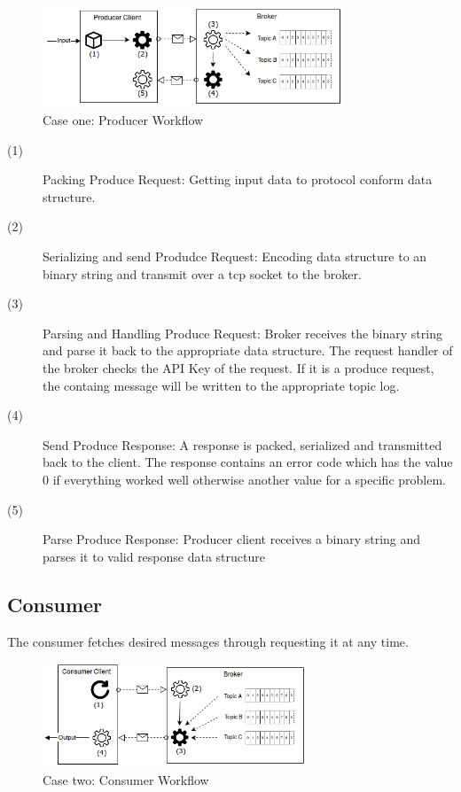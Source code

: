 \begin{figure}[H]
    \centering
    \includegraphics[width=0.8\textwidth]{images/concept_producer.png}
    \caption{Case one: Producer Workflow}
    \label{fig:conept-producer}
\end{figure}

\begin{description}
    \item [(1)] 
        {Packing Produce Request: Getting input data to protocol conform data structure.}
    \item [(2)] 
        {Serializing and send Produdce Request: Encoding data structure to an
            binary  string and transmit over a tcp socket to the broker.}
    \item [(3)] 
        {Parsing and Handling Produce Request: Broker receives the binary string
            and parse it back to the appropriate data structure. The request
            handler of the  broker checks the API Key of the request. If it is a
            produce request, the containg message will be written to the
            appropriate topic log.}
    \item [(4)] 
        {Send Produce Response: A response is packed, serialized and transmitted
            back to the client. The response contains an error code which has
            the value 0 if everything worked well otherwise another value for a
            specific problem. }
    \item [(5)] 
        {Parse Produce Response: Producer client receives a binary string and
            parses it to valid response data structure }
\end{description}

\subsection{Consumer}

The consumer fetches desired messages through requesting it at any time.

\begin{figure}[H]
    \centering
   \includegraphics[width=0.7\textwidth]{images/concept_consumer.png}
    \caption{Case two: Consumer Workflow}
    \label{fig:concept-consumer}
\end{figure}


